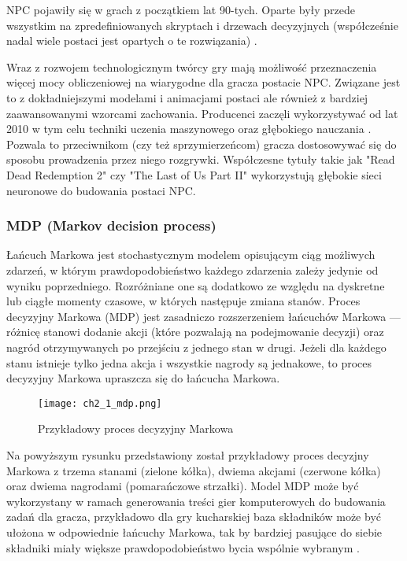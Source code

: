 NPC pojawiły się w grach z początkiem lat 90-tych. Oparte były przede wszystkim na zpredefiniowanych
skryptach i drzewach decyzyjnych\cite{storytelling_through} (współcześnie nadal wiele postaci jest
opartych o te rozwiązania) \cite{from_pong_to_narrative}.

Wraz z rozwojem technologicznym twórcy gry mają możliwość przeznaczenia więcej mocy obliczeniowej
na wiarygodne dla gracza postacie NPC. Związane jest to z dokładniejszymi modelami i animacjami
postaci ale również z bardziej zaawansowanymi wzorcami zachowania. Producenci zaczęli wykorzystywać
od lat 2010 w tym celu techniki uczenia maszynowego oraz głębokiego nauczania
\cite{from_pong_to_narrative}. Pozwala to przeciwnikom (czy też sprzymierzeńcom) gracza
dostosowywać się do sposobu prowadzenia przez niego rozgrywki. Współczesne tytuły takie jak
"Read Dead Redemption 2" czy "The Last of Us Part II" wykorzystują głębokie sieci neuronowe do
budowania postaci NPC\cite{from_pong_to_narrative}.

\subsubsection*{MDP (Markov decision process)}

Łańcuch Markowa jest stochastycznym modelem opisującym ciąg możliwych zdarzeń, w którym
prawdopodobieństwo każdego zdarzenia zależy jedynie od wyniku poprzedniego. Rozróżniane one
są dodatkowo ze względu na dyskretne lub ciągłe momenty czasowe, w których następuje zmiana
stanów. Proces decyzyjny Markowa (MDP) jest zasadniczo rozszerzeniem łańcuchów Markowa ---
różnicę stanowi dodanie akcji (które pozwalają na podejmowanie decyzji) oraz nagród otrzymywanych
po przejściu z jednego stan w drugi. Jeżeli dla każdego stanu istnieje tylko jedna akcja i
wszystkie nagrody są jednakowe, to proces decyzyjny Markowa upraszcza się do łańcucha Markowa.

\begin{figure}[h]
    \centering
    \texttt{[image: ch2\_1\_mdp.png]}
    \caption{Przykładowy proces decyzyjny Markowa}
    \label{fig:ch2_1_mdp}
\end{figure}

Na powyższym rysunku przedstawiony został przykładowy proces decyzjny Markowa z trzema stanami (zielone
kółka), dwiema akcjami (czerwone kółka) oraz dwiema nagrodami (pomarańczowe strzałki). Model MDP może
być wykorzystany w ramach generowania treści gier komputerowych do budowania zadań dla gracza,
przykładowo dla gry kucharskiej baza składników może być ułożona w odpowiednie łańcuchy Markowa, tak
by bardziej pasujące do siebie składniki miały większe prawdopodobieństwo bycia wspólnie wybranym
\cite{ammanabrolu2020automated}.

